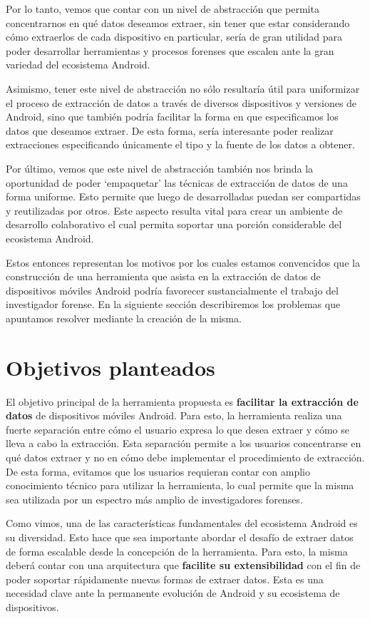 Por lo tanto, vemos que contar con un nivel de abstracción que permita concentrarnos en qué datos deseamos extraer, sin tener que estar considerando cómo extraerlos de cada dispositivo en particular, sería de gran utilidad para poder desarrollar herramientas y procesos forenses que escalen ante la gran variedad del ecosistema Android.

Asimismo, tener este nivel de abstracción no sólo resultaría útil para uniformizar el proceso de extracción de datos a través de diversos dispositivos y versiones de Android, sino que también podría facilitar la forma en que especificamos los datos que deseamos extraer. De esta forma, sería interesante poder realizar extracciones especificando únicamente el tipo y la fuente de los datos a obtener.

Por último, vemos que este nivel de abstracción también nos brinda la oportunidad de poder \enquote*{empaquetar} las técnicas de extracción de datos de una forma uniforme. Esto permite que luego de desarrolladas puedan ser compartidas y reutilizadas por otros. Este aspecto resulta vital para crear un ambiente de desarrollo colaborativo el cual permita soportar una porción considerable del ecosistema Android.

Estos entonces representan los motivos por los cuales estamos convencidos que la construcción de una herramienta que asista en la extracción de datos de dispositivos móviles Android podría favorecer sustancialmente el trabajo del investigador forense. En la siguiente sección describiremos los problemas que apuntamos resolver mediante la creación de la misma.

\section{Objetivos planteados}
El objetivo principal de la herramienta propuesta es \textbf{facilitar la extracción de datos} de dispositivos móviles Android. Para esto, la herramienta realiza una fuerte separación entre cómo el usuario expresa lo que desea extraer y cómo se lleva a cabo la extracción. Esta separación permite a los usuarios concentrarse en qué datos extraer y no en cómo debe implementar el procedimiento de extracción. De esta forma, evitamos que los usuarios requieran contar con amplio conocimiento técnico para utilizar la herramienta, lo cual permite que la misma sea utilizada por un espectro más amplio de investigadores forenses.

Como vimos, una de las características fundamentales del ecosistema Android es su diversidad. Esto hace que sea importante abordar el desafío de extraer datos de forma escalable desde la concepción de la herramienta. Para esto, la misma deberá contar con una arquitectura que \textbf{facilite su extensibilidad} con el fin de poder soportar rápidamente nuevas formas de extraer datos. Esta es una necesidad clave ante la permanente evolución de Android y su ecosistema de dispositivos.

